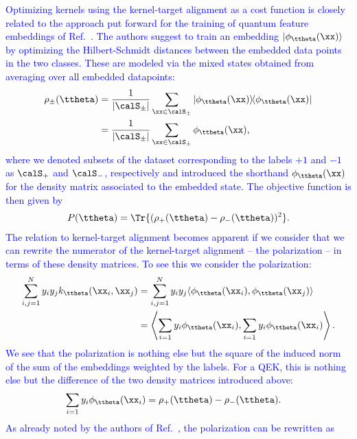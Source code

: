 \documentclass[twocolumn,superscriptaddress,nofootinbib]{revtex4-2}
\newcommand{\jjm}[1]{\textcolor{blue}{#1}}
\begin{document}
    \jjm{
        Optimizing kernels using the kernel-target alignment as a cost function is closely related to the approach put forward for the training of quantum feature embeddings of Ref.~\cite{lloyd2020QuantumEmbeddingsML}. The authors suggest to train an embedding $\ket{\phi_{\ttheta}(\xx)}$ by optimizing the Hilbert-Schmidt distances between the embedded data points in the two classes. These are modeled via the mixed states obtained from averaging over all embedded datapoints:
        \begin{align}
            \rho_{\pm}(\ttheta) &= \frac{1}{|\calS_{\pm}|} \sum_{\xx \in \calS_{\pm}} | \phi_{\ttheta}(\xx) \rangle \! \langle \phi_{\ttheta}(\xx) | \\
            &= \frac{1}{|\calS_{\pm}|} \sum_{\xx \in \calS_{\pm}} \phi_{\ttheta}(\xx) ,
        \end{align}
        where we denoted subsets of the dataset corresponding to the labels $+1$ and $-1$ as $\calS_{+}$ and $\calS_{-}$, respectively and introduced the shorthand $\phi_{\ttheta}(\xx)$ for the density matrix associated to the embedded state. The objective function is then given by
        \begin{align}
            P(\ttheta) = \Tr\{(\rho_{+}(\ttheta) - \rho_{-}(\ttheta))^2 \}.
        \end{align}
        The relation to kernel-target alignment becomes apparent if we consider that we can rewrite the numerator of the kernel-target alignment -- the polarization -- in terms of these density matrices. To see this we consider the polarization:
        \begin{align}
            \sum_{i,j=1}^N y_i y_j k_{\ttheta}(\xx_i, \xx_j)
            &= \sum_{i,j=1}^N y_i y_j \langle \phi_{\ttheta}(\xx_i), \phi_{\ttheta}(\xx_j) \rangle \\
            &= \left\langle \sum_{i=1} y_i \phi_{\ttheta}(\xx_i), \sum_{i=1} y_i \phi_{\ttheta}(\xx_i) \right\rangle.
        \end{align}
        We see that the polarization is nothing else but the square of the induced norm of the sum of the embeddings weighted by the labels. For a \ac{QEK}, this is nothing else but the difference of the two density matrices introduced above:
        \begin{align}
            \sum_{i=1} y_i \phi_{\ttheta}(\xx_i) &= \rho_{+}(\ttheta) - \rho_{-}(\ttheta).
        \end{align}
        As already noted by the authors of Ref.~\cite{lloyd2020QuantumEmbeddingsML}, the polarization can be rewritten as
}
\end{document}
